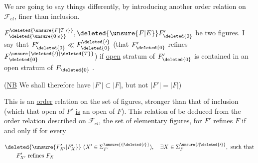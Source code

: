
We are going to say things differently, by introducing another order relation on $\mathcal{F}_{el}$, finer than inclusion.


 $F_{\deleted{\unsure{0|e}}}^{\deleted{\unsure{F|T|\prime}}},\deleted{\unsure{F|E}}F_{\deleted{0}}'$ be two  figures. I say that $F_{\deleted{0}}'\ll F_{\deleted{0}}^{\deleted{\prime}}$ (that $F_{\deleted{0}}'$ refines $F_{\deleted{0}}^{\unsure{\deleted{\prime}|\deleted{T}}}$) if   \uline{open} stratum of $F_{\deleted{0}}'$ is contained in an open stratum of $F_{\deleted{0}}$ .

(\uline{NB} We shall therefore have  $|F'|\subset|F|$, but not  $|F'|=|F|$)

This is an \uline{order} relation on the set of figures, stronger than that of inclusion (which   that  open  of $F'$ \uline{is} an open  of $F$). This relation of    be deduced  from the order relation  described on $\mathcal{F}_{el}$, the set of elementary figures, for $F'$ refines $F$ if and only if for every

\[
\begin{aligned}
&\deleted{\unsure{F'_{X'}|F'_{X}}}\ (X'\in{\Sigma}^{\unsure{\prime|\deleted{\prime}}}_{F'}),\quad \exists X\in\Sigma^{\unsure{\prime|\deleted{\prime}}}_F,\ \text{such that}\\
&\qquad F'_{X'}\ \text{refines}\ F_X
\end{aligned}
\]
